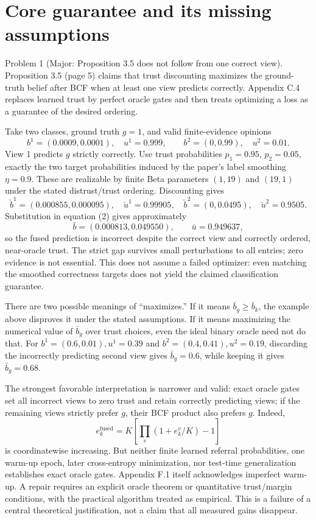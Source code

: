 \documentclass[10pt]{article}
\begin{document}
\section*{Core guarantee and its missing assumptions}
Problem 1 (Major: Proposition 3.5 does not follow from one correct view).  Proposition 3.5 (page 5) claims that trust discounting maximizes the ground-truth belief after BCF when at least one view predicts correctly. Appendix C.4 replaces learned trust by perfect oracle gates and then treats optimizing a loss as a guarantee of the desired ordering.\par
Take two classes, ground truth \(g=1\), and valid finite-evidence opinions \[b^1=(0.0009,0.0001),\quad u^1=0.999,
 \qquad b^2=(0,0.99),\quad u^2=0.01.\] View 1 predicts \(g\) strictly correctly. Use trust probabilities \(p_1=0.95\), \(p_2=0.05\), exactly the two target probabilities induced by the paper’s label smoothing \(\eta=0.9\). These are realizable by finite Beta parameters \((1,19)\) and \((19,1)\) under the stated distrust/trust ordering. Discounting gives \[\breve b^1=(0.000855,0.000095),\quad \breve u^1=0.99905,
 \quad \breve b^2=(0,0.0495),\quad \breve u^2=0.9505.\] Substitution in equation (2) gives approximately \[\bar b=(0.000813,0.049550),\qquad \bar u=0.949637,\] so the fused prediction is incorrect despite the correct view and correctly ordered, near-oracle trust. The strict gap survives small perturbations to all entries; zero evidence is not essential. This does not assume a failed optimizer: even matching the smoothed correctness targets does not yield the claimed classification guarantee.\par
There are two possible meanings of “maximizes.” If it means \(\bar b_g\geq\bar b_k\), the example above disproves it under the stated assumptions. If it means maximizing the numerical value of \(\bar b_g\) over trust choices, even the ideal binary oracle need not do that. For \(b^1=(0.6,0.01),u^1=0.39\) and \(b^2=(0.4,0.41),u^2=0.19\), discarding the incorrectly predicting second view gives \(\bar b_g=0.6\), while keeping it gives \(\bar b_g=0.68\).\par
The strongest favorable interpretation is narrower and valid: exact oracle gates set all incorrect views to zero trust and retain correctly predicting views; if the remaining views strictly prefer \(g\), their BCF product also prefers \(g\). Indeed, \[e_k^{\mathrm{fused}}=K\left[\prod_v(1+e_k^v/K)-1\right]\] is coordinatewise increasing. But neither finite learned referral probabilities, one warm-up epoch, later cross-entropy minimization, nor test-time generalization establishes exact oracle gates. Appendix F.1 itself acknowledges imperfect warm-up. A repair requires an explicit oracle theorem or quantitative trust/margin conditions, with the practical algorithm treated as empirical. This is a failure of a central theoretical justification, not a claim that all measured gains disappear.\par
\end{document}
